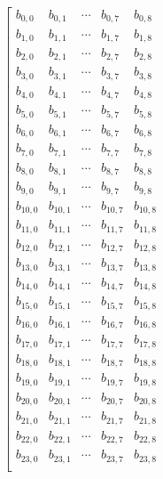 \documentclass{article}
\begin{document}
\begin{align}
    &\left[
    \begin{matrix}
        b_{0,0}  & b_{0,1}  & \cdots & b_{0,7}  & b_{0,8}  \\
        b_{1,0}  & b_{1,1}  & \cdots & b_{1,7}  & b_{1,8}  \\
        b_{2,0}  & b_{2,1}  & \cdots & b_{2,7}  & b_{2,8}  \\
        b_{3,0}  & b_{3,1}  & \cdots & b_{3,7}  & b_{3,8}  \\
        b_{4,0}  & b_{4,1}  & \cdots & b_{4,7}  & b_{4,8}  \\
        b_{5,0}  & b_{5,1}  & \cdots & b_{5,7}  & b_{5,8}  \\
        b_{6,0}  & b_{6,1}  & \cdots & b_{6,7}  & b_{6,8}  \\
        b_{7,0}  & b_{7,1}  & \cdots & b_{7,7}  & b_{7,8}  \\
        b_{8,0}  & b_{8,1}  & \cdots & b_{8,7}  & b_{8,8}  \\
        b_{9,0}  & b_{9,1}  & \cdots & b_{9,7}  & b_{9,8}  \\
        b_{10,0} & b_{10,1} & \cdots & b_{10,7} & b_{10,8} \\
        b_{11,0} & b_{11,1} & \cdots & b_{11,7} & b_{11,8} \\
        b_{12,0} & b_{12,1} & \cdots & b_{12,7} & b_{12,8} \\
        b_{13,0} & b_{13,1} & \cdots & b_{13,7} & b_{13,8} \\
        b_{14,0} & b_{14,1} & \cdots & b_{14,7} & b_{14,8} \\
        b_{15,0} & b_{15,1} & \cdots & b_{15,7} & b_{15,8} \\
        b_{16,0} & b_{16,1} & \cdots & b_{16,7} & b_{16,8} \\
        b_{17,0} & b_{17,1} & \cdots & b_{17,7} & b_{17,8} \\
        b_{18,0} & b_{18,1} & \cdots & b_{18,7} & b_{18,8} \\
        b_{19,0} & b_{19,1} & \cdots & b_{19,7} & b_{19,8} \\
        b_{20,0} & b_{20,1} & \cdots & b_{20,7} & b_{20,8} \\
        b_{21,0} & b_{21,1} & \cdots & b_{21,7} & b_{21,8} \\
        b_{22,0} & b_{22,1} & \cdots & b_{22,7} & b_{22,8} \\
        b_{23,0} & b_{23,1} & \cdots & b_{23,7} & b_{23,8} \\
    \end{matrix}

\end{align}
\end{document}

